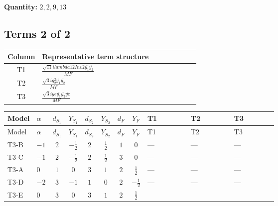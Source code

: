 \documentclass[8pt]{article}
\begin{document}
\begin{landscape}
\begin{longtable}{@{}llcccccc >{\raggedright\arraybackslash}p{0.21\linewidth} >{\raggedright\arraybackslash}p{0.21\linewidth} >{\raggedright\arraybackslash}p{0.21\linewidth}@{}}
\midrule
\bottomrule
\end{longtable}
\clearpage
\noindent\textbf{Quantity: }$\mathrm{2,2,9,13}$\par\smallskip
\subsection*{Terms 2 of 2}
\begin{center}
\begin{tabular}{@{}c >{\raggedright\arraybackslash}p{0.82\linewidth}@{}}
\toprule
Column & Representative term structure \\
\midrule
T1 & \(\displaystyle \frac{\sqrt{11} i lambda12Inv2 \overline{y_{1}} \overline{y_{2}}}{MF}\) \\
\midrule
T2 & \(\displaystyle \frac{\sqrt{3} i g_{2}^{2} \overline{y_{1}} \overline{y_{2}}}{MF}\) \\
\midrule
T3 & \(\displaystyle \frac{\sqrt{3} i ye \overline{y_{1}} \overline{y_{2}} \overline{ye}}{MF}\) \\
\midrule
\bottomrule
\end{tabular}
\end{center}
\smallskip
\tiny
\begin{longtable}{@{}llcccccc >{\raggedright\arraybackslash}p{0.21\linewidth} >{\raggedright\arraybackslash}p{0.21\linewidth} >{\raggedright\arraybackslash}p{0.21\linewidth}@{}}
\toprule
Model & $\alpha$ & $d_{S_1}$ & $Y_{S_1}$ & $d_{S_2}$ & $Y_{S_2}$ & $d_F$ & $Y_F$ & T1 & T2 & T3 \\
\midrule
\endfirsthead
\toprule
Model & $\alpha$ & $d_{S_1}$ & $Y_{S_1}$ & $d_{S_2}$ & $Y_{S_2}$ & $d_F$ & $Y_F$ & T1 & T2 & T3 \\
\midrule
\endhead
T3-B & $-1$ & $2$ & $-\frac{1}{2}$ & $2$ & $\frac{1}{2}$ & $1$ & $0$ & --- & --- & --- \\
\midrule
T3-C & $-1$ & $2$ & $-\frac{1}{2}$ & $2$ & $\frac{1}{2}$ & $3$ & $0$ & --- & --- & --- \\
\midrule
T3-A & $0$ & $1$ & $0$ & $3$ & $1$ & $2$ & $\frac{1}{2}$ & --- & --- & --- \\
\midrule
T3-D & $-2$ & $3$ & $-1$ & $1$ & $0$ & $2$ & $-\frac{1}{2}$ & --- & --- & --- \\
\midrule
T3-E & $0$ & $3$ & $0$ & $3$ & $1$ & $2$ & $\frac{1}{2}$ & \scriptsize\adjustbox{max width=\linewidth}{$\begin{gathered} \frac{3 \sqrt{11} i lambda12Inv2 \overline{y_{1}} \overline{y_{2}}}{22 MF}\end{gathered}$} & \scriptsize\adjustbox{max width=\linewidth}{$\begin{gathered} \frac{11 \sqrt{3} i g_{2}^{2} \overline{y_{1}} \overline{y_{2}}}{8 MF}\end{gathered}$} & \scriptsize\adjustbox{max width=\linewidth}{$\begin{gathered} - \frac{\sqrt{3} i ye \overline{y_{1}} \overline{y_{2}} \overline{ye}}{12 MF}\end{gathered}$} \\

\end{longtable}
\end{landscape}
\end{document}
